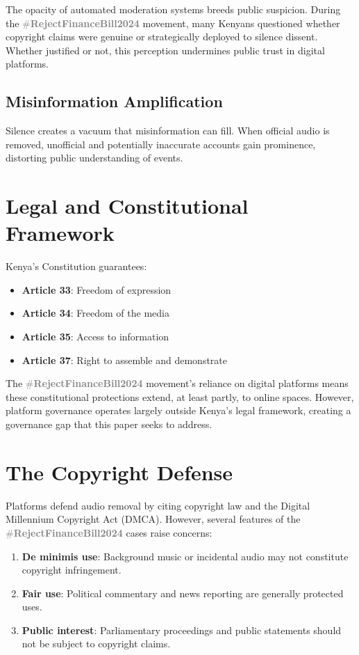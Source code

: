 \documentclass{article}
\newcommand{\rejectbill}{\textcolor{gray}{\#\textbf{RejectFinanceBill2024}}}
\begin{document}
The opacity of automated moderation systems breeds public suspicion. During the \rejectbill{} movement, many Kenyans questioned whether copyright claims were genuine or strategically deployed to silence dissent. Whether justified or not, this perception undermines public trust in digital platforms.

\subsection{Misinformation Amplification}

Silence creates a vacuum that misinformation can fill. When official audio is removed, unofficial and potentially inaccurate accounts gain prominence, distorting public understanding of events.

\section{Legal and Constitutional Framework}

Kenya's Constitution guarantees:

\begin{itemize}
\item \textbf{Article 33}: Freedom of expression
\item \textbf{Article 34}: Freedom of the media
\item \textbf{Article 35}: Access to information
\item \textbf{Article 37}: Right to assemble and demonstrate
\end{itemize}

The \rejectbill{} movement's reliance on digital platforms means these constitutional protections extend, at least partly, to online spaces. However, platform governance operates largely outside Kenya's legal framework, creating a governance gap that this paper seeks to address.

\section{The Copyright Defense}

Platforms defend audio removal by citing copyright law and the Digital Millennium Copyright Act (DMCA). However, several features of the \rejectbill{} cases raise concerns:

\begin{enumerate}
\item \textbf{De minimis use}: Background music or incidental audio may not constitute copyright infringement.
\item \textbf{Fair use}: Political commentary and news reporting are generally protected uses.
\item \textbf{Public interest}: Parliamentary proceedings and public statements should not be subject to copyright claims.
\end{enumerate}
\end{document}
